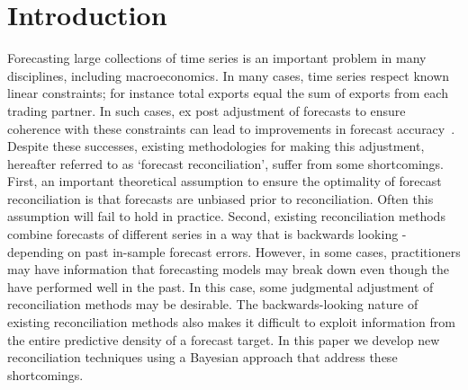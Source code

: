 \documentclass[a4paper,fleqn,11pt]{article}
\begin{document}
			




\section{Introduction}
\label{sec:intro}
Forecasting large collections of time series is an important problem in many disciplines, including macroeconomics.  In many cases, time series respect known linear constraints; for instance total exports equal the sum of exports from each trading partner. In such cases, ex post adjustment of forecasts to ensure coherence with these constraints can lead to improvements in forecast accuracy~\citep[see][and references therein]{Wickramasuriya2015}. Despite these successes, existing methodologies for making this adjustment, hereafter referred to as `forecast reconciliation', suffer from some shortcomings.  First, an important theoretical assumption to ensure the optimality of forecast reconciliation is that forecasts are unbiased prior to reconciliation.  Often this assumption will fail to hold in practice.  Second, existing reconciliation methods combine forecasts of different series in a way that is backwards looking - depending on past in-sample forecast errors.  However, in some cases, practitioners may have information that forecasting models may break down even though the have performed well in the past. In this case, some judgmental adjustment of reconciliation methods may be desirable.  The backwards-looking nature of existing reconciliation methods also makes it difficult to exploit information from the entire predictive density of a forecast target.  In this paper we develop new reconciliation techniques using a Bayesian approach that address these shortcomings.
\end{document}
